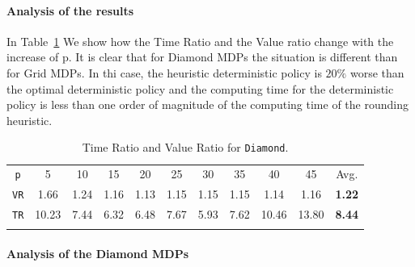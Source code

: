 \paragraph{Analysis of the results}
In Table~\ref{tab:diamond} We show how the Time Ratio and the Value ratio change with the increase of p.
It is clear that for Diamond MDPs the situation is different than for Grid MDPs. In thi case, the heuristic deterministic policy is $20\%$ worse than the optimal deterministic policy and the computing time for the deterministic policy is less than one order of magnitude of the computing time of the rounding heuristic.


\begin{table}[h]																	
 \centering
 \small
 \setlength{\tabcolsep}{4.0pt}
 \renewcommand \arraystretch{1.8}
\begin{tabular}{ccccccccccc}																					
\texttt{p}	&	5	&	10	&	15	&	20	&	25	&	30	&	35	&	40	&	45	&	Avg.	\\	
\cmidrule(lr){1-1} \cmidrule(lr){2-10} \cmidrule(lr){11-11}
\texttt{VR} &	1.66	&	1.24	&	1.16	&	1.13	&	1.15	&	1.15	&	1.15	&	1.14	&	1.16	&	\textbf{1.22}	\\	
\texttt{TR} &	10.23	&	7.44	&	6.32	&	6.48	&	7.67	&	5.93	&	7.62	&	10.46	&	13.80	&	\textbf{8.44}	\\	\\
\end{tabular}
\caption{Time Ratio and Value Ratio for \texttt{Diamond}.}														\label{tab:diamond}								
\end{table}																						






\paragraph{Analysis of the Diamond MDPs}

